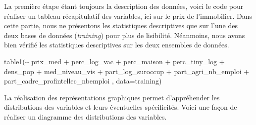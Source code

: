 \documentclass[
  french,
  11pt,
  a4paper,
]{article}
\newenvironment{Shaded}{}{}
\newcommand{\AttributeTok}[1]{\textcolor[rgb]{0.84,0.23,0.29}{#1}}
\newcommand{\FunctionTok}[1]{\textcolor[rgb]{0.44,0.26,0.76}{#1}}
\newcommand{\NormalTok}[1]{\textcolor[rgb]{0.14,0.16,0.18}{#1}}
\newcommand{\SpecialCharTok}[1]{\textcolor[rgb]{0.00,0.36,0.77}{#1}}
\begin{document}
La première étape étant toujours la description des données, voici le
code pour réaliser un tableau récapitulatif des variables, ici sur le
prix de l'immobilier. Dans cette partie, nous ne présentons les
statistiques descriptives que sur l'une des deux bases de données
(\emph{training}) pour plus de lisibilité. Néanmoins, nous avons bien
vérifié les statistiques descriptives sur les deux ensembles de données.

\begin{Shaded}
\begin{Highlighting}[]
\FunctionTok{table1}\NormalTok{(}\SpecialCharTok{\textasciitilde{}}\NormalTok{ prix\_med }\SpecialCharTok{+}\NormalTok{ perc\_log\_vac }\SpecialCharTok{+}\NormalTok{ perc\_maison }\SpecialCharTok{+}\NormalTok{ perc\_tiny\_log }\SpecialCharTok{+}\NormalTok{ dens\_pop }\SpecialCharTok{+}\NormalTok{ med\_niveau\_vis }\SpecialCharTok{+}\NormalTok{ part\_log\_suroccup }\SpecialCharTok{+}\NormalTok{ part\_agri\_nb\_emploi }\SpecialCharTok{+}\NormalTok{ part\_cadre\_profintellec\_nbemploi , }\AttributeTok{data=}\NormalTok{training) }
\end{Highlighting}
\end{Shaded}

La réalisation des représentations graphiques permet d'appréhender les
distributions des variables et leurs éventuelles spécificités. Voici une
façon de réaliser un diagramme des distributions des variables.
\end{document}
